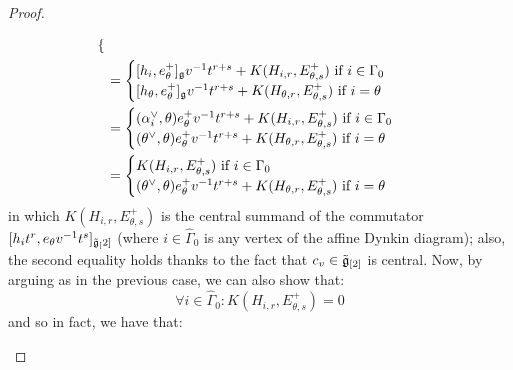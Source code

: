 \begin{proof}
\begin{itemize}
$$\begin{aligned}
\begin{cases}
                                \end{cases}
                                \\
                                & =
                                \begin{cases}
                                    \text{$[h_i, e_{\theta}^+]_{\mathfrak{g}} v^{-1} t^{r + s} + K(H_{i, r}, E_{\theta, s}^+)$ if $i \in \Gamma_0$}
                                    \\
                                    \text{$[h_{\theta}, e_{\theta}^+]_{\mathfrak{g}} v^{-1} t^{r + s} + K(H_{\theta, r}, E_{\theta, s}^+)$ if $i = \theta$}
                                \end{cases}
                                \\
                                & = 
                                \begin{cases}
                                    \text{$(\alpha_i^{\vee}, \theta) e_{\theta}^+ v^{-1} t^{r + s} + K(H_{i, r}, E_{\theta, s}^+)$ if $i \in \Gamma_0$}
                                    \\
                                    \text{$(\theta^{\vee}, \theta) e_{\theta}^+ v^{-1} t^{r + s} + K(H_{\theta, r}, E_{\theta, s}^+)$ if $i = \theta$}
                                \end{cases}
                                \\
                                & = 
                                \begin{cases}
                                    \text{$K(H_{i, r}, E_{\theta, s}^+)$ if $i \in \Gamma_0$}
                                    \\
                                    \text{$(\theta^{\vee}, \theta) e_{\theta}^+ v^{-1} t^{r + s} + K(H_{\theta, r}, E_{\theta, s}^+)$ if $i = \theta$}
                                \end{cases}
                            \end{aligned}
                        $$
                    in which $K(H_{i, r}, E_{\theta, s}^+)$ is the central summand of the commutator $[h_i t^r, e_{\theta} v^{-1} t^s]_{\tilde{\mathfrak{g}}_[2]}$ (where $i \in \hat{\Gamma}_0$ is any vertex of the affine Dynkin diagram); also, the second equality holds thanks to the fact that $c_v \in \tilde{\mathfrak{g}}_{[2]}$ is central. Now, by arguing as in the previous case, we can also show that:
                        $$\forall i \in \hat{\Gamma}_0: K(H_{i, r}, E_{\theta, s}^+) = 0$$
                    and so in fact, we have that:

\end{itemize}
\end{proof}
